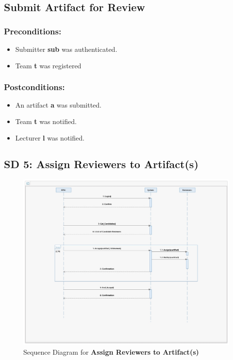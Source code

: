 \subsection*{Submit Artifact for Review}

\subsubsection*{Preconditions:}
\begin{itemize}
\itemsep-1.5em 
    \item Submitter \textbf{sub} was authenticated.
    \item Team \textbf{t} was registered
  
   
\end{itemize}



\subsubsection*{Postconditions:}
\begin{itemize}
\itemsep-1.5em 
   \item An artifact \textbf{a} was submitted.
   \item Team \textbf{t} was notified.
   \item Lecturer \textbf{l} was notified.

\end{itemize}




\subsection*{SD 5: Assign Reviewers to Artifact(s)}

\begin{figure}[h]
\includegraphics[width=16cm]{SD_AssignReviewerstoArtifacts.jpeg}
\centering
\caption{Sequence Diagram for \textbf{Assign Reviewers to Artifact(s)}}
\end{figure}


